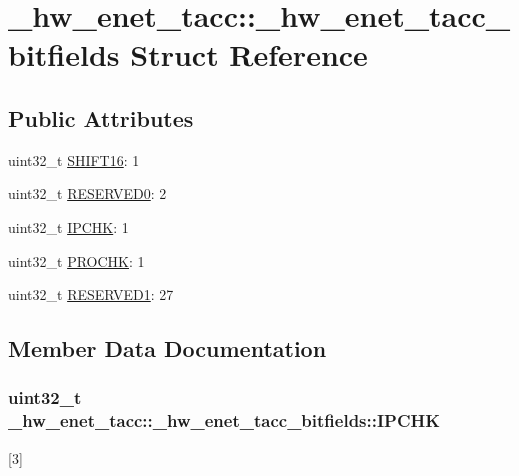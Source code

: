 \hypertarget{struct__hw__enet__tacc_1_1__hw__enet__tacc__bitfields}{}\section{\+\_\+hw\+\_\+enet\+\_\+tacc\+:\+:\+\_\+hw\+\_\+enet\+\_\+tacc\+\_\+bitfields Struct Reference}
\label{struct__hw__enet__tacc_1_1__hw__enet__tacc__bitfields}
\subsection*{Public Attributes}
\begin{DoxyCompactItemize}
\item 
uint32\+\_\+t \hyperlink{struct__hw__enet__tacc_1_1__hw__enet__tacc__bitfields_a6a0ad30acabb718aa80590569abadf43}{S\+H\+I\+F\+T16}\+: 1
\item 
uint32\+\_\+t \hyperlink{struct__hw__enet__tacc_1_1__hw__enet__tacc__bitfields_ab4b32d55af02048a4181dee6fad2ac19}{R\+E\+S\+E\+R\+V\+E\+D0}\+: 2
\item 
uint32\+\_\+t \hyperlink{struct__hw__enet__tacc_1_1__hw__enet__tacc__bitfields_a238df5e413359ba0993ea3355bb58554}{I\+P\+C\+HK}\+: 1
\item 
uint32\+\_\+t \hyperlink{struct__hw__enet__tacc_1_1__hw__enet__tacc__bitfields_a84305c6ddbfb4cab3514a15d0c7c13b2}{P\+R\+O\+C\+HK}\+: 1
\item 
uint32\+\_\+t \hyperlink{struct__hw__enet__tacc_1_1__hw__enet__tacc__bitfields_a853ade2d9524a2e2818c54a45896771a}{R\+E\+S\+E\+R\+V\+E\+D1}\+: 27
\end{DoxyCompactItemize}


\subsection{Member Data Documentation}
\subsubsection[{\texorpdfstring{I\+P\+C\+HK}{IPCHK}}]{\setlength{\rightskip}{0pt plus 5cm}uint32\+\_\+t \+\_\+hw\+\_\+enet\+\_\+tacc\+::\+\_\+hw\+\_\+enet\+\_\+tacc\+\_\+bitfields\+::\+I\+P\+C\+HK}\hypertarget{struct__hw__enet__tacc_1_1__hw__enet__tacc__bitfields_a238df5e413359ba0993ea3355bb58554}{}\label{struct__hw__enet__tacc_1_1__hw__enet__tacc__bitfields_a238df5e413359ba0993ea3355bb58554}
\mbox{[}3\mbox{]} 

